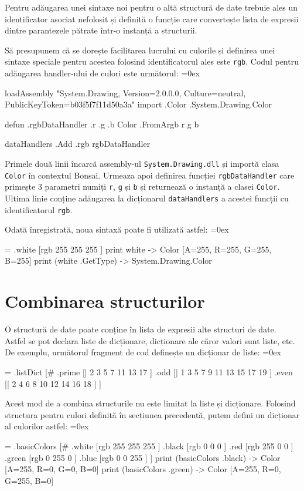 \documentclass[12pt,a4paper]{memoir}
\renewcommand{\c}{\texttt}
\newenvironment{code}
{
\definecolor{shadecolor}{gray}{0.91}
\topsep=0ex
\relax
\shaded
\verbatim
}
{
\endverbatim
\endshaded
}
\begin{document}
Pentru adăugarea unei sintaxe noi pentru o altă structură de date trebuie ales un identificator asociat nefolosit și definită o funcție care convertește lista de expresii dintre parantezele pătrate într-o instanță a structurii.

Să presupunem că se dorește facilitarea lucrului cu culorile și definirea unei sintaxe speciale pentru acestea folosind identificatorul ales este \c{rgb}. Codul pentru adăugarea handler-ului de culori este următorul:
\begin{code}
loadAssembly "System.Drawing, Version=2.0.0.0, Culture=neutral,
    PublicKeyToken=b03f5f7f11d50a3a"
import .Color .System.Drawing.Color

defun .rgbDataHandler .r .g .b {
	Color .FromArgb r g b
}

dataHandlers .Add .rgb rgbDataHandler
\end{code}
Primele două linii încarcă assembly-ul \c{System.Drawing.dll} și importă clasa \c{Color} în contextul Bonsai. Urmeaza apoi definirea funcției \c{rgbDataHandler} care primește 3 parametri numiți \c{r}, \c{g} și \c{b} și returnează o instanță a clasei \c{Color}. Ultima linie conține adăugarea la dicționarul \c{dataHandlers} a acestei funcții cu identificatorul \c{rgb}. 

Odată înregistrată, noua sintaxă poate fi utilizată astfel:
\begin{code}
= .white [rgb 255 255 255 ]
print white
  -> Color [A=255, R=255, G=255, B=255]
print (white .GetType)
  -> System.Drawing.Color
\end{code}

\section{Combinarea structurilor}

O structură de date poate conține în lista de expresii alte structuri de date. Astfel se pot declara liste de dicționare, dicționare ale căror valori sunt liste, etc. De exemplu, următorul fragment de cod definește un dicționar de liste:
\begin{code}
= .listDict [#
  .prime [| 2 3 5 7 11 13 17 ]
  .odd [| 1 3 5 7 9 11 13 15 17 19 ]
  .even [| 2 4 6 8 10 12 14 16 18 ]
]
\end{code}

Acest mod de a combina structurile nu este limitat la liste și dicționare. Folosind structura pentru culori definită în secțiunea precedentă, putem defini un dicționar al culorilor astfel:
\begin{code}
= .basicColors [#
  .white [rgb 255 255 255 ]
  .black [rgb 0 0 0 ]
  .red [rgb 255 0 0 ]
  .green [rgb 0 255 0 ]
  .blue [rgb 0 0 255 ]
]
print (basicColors .black)
  -> Color [A=255, R=0, G=0, B=0]
print (basicColors .green)
  -> Color [A=255, R=0, G=255, B=0]
\end{code}
\end{document}
